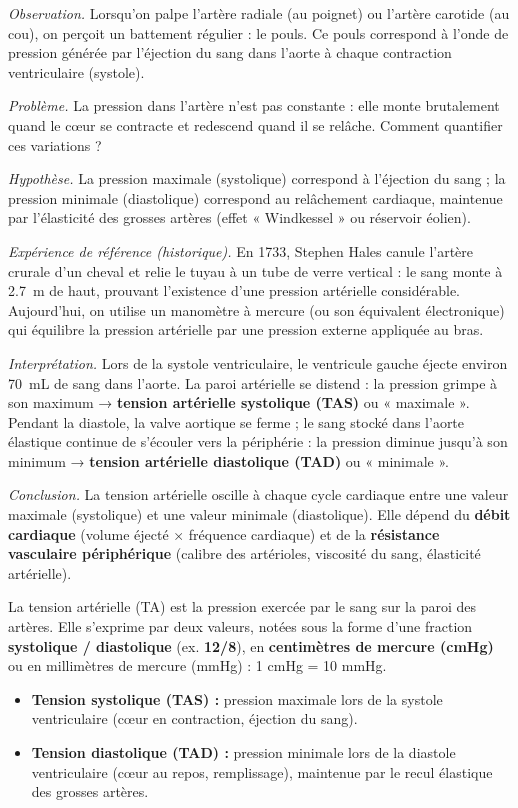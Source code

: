 \documentclass[11pt]{article}
\newcommand{\cle}[1]{{\popxbold\color{popdark}#1}}
\begin{document}
\emph{Observation.} Lorsqu'on palpe l'artère radiale (au poignet) ou l'artère carotide (au cou), on perçoit un battement régulier : le pouls. Ce pouls correspond à l'onde de pression générée par l'éjection du sang dans l'aorte à chaque contraction ventriculaire (systole).

\emph{Problème.} La pression dans l'artère n'est pas constante : elle monte brutalement quand le cœur se contracte et redescend quand il se relâche. Comment quantifier ces variations ?

\emph{Hypothèse.} La pression maximale (systolique) correspond à l'éjection du sang ; la pression minimale (diastolique) correspond au relâchement cardiaque, maintenue par l'élasticité des grosses artères (effet « Windkessel » ou réservoir éolien).

\emph{Expérience de référence (historique).} En 1733, Stephen Hales canule l'artère crurale d'un cheval et relie le tuyau à un tube de verre vertical : le sang monte à \SI{2,7}{m} de haut, prouvant l'existence d'une pression artérielle considérable. Aujourd'hui, on utilise un manomètre à mercure (ou son équivalent électronique) qui équilibre la pression artérielle par une pression externe appliquée au bras.

\emph{Interprétation.} Lors de la systole ventriculaire, le ventricule gauche éjecte environ \SI{70}{mL} de sang dans l'aorte. La paroi artérielle se distend : la pression grimpe à son maximum → \textbf{tension artérielle systolique (TAS)} ou « maximale ». Pendant la diastole, la valve aortique se ferme ; le sang stocké dans l'aorte élastique continue de s'écouler vers la périphérie : la pression diminue jusqu'à son minimum → \textbf{tension artérielle diastolique (TAD)} ou « minimale ».

\emph{Conclusion.} La tension artérielle oscille à chaque cycle cardiaque entre une valeur maximale (systolique) et une valeur minimale (diastolique). Elle dépend du \textbf{débit cardiaque} (volume éjecté × fréquence cardiaque) et de la \textbf{résistance vasculaire périphérique} (calibre des artérioles, viscosité du sang, élasticité artérielle).

\begin{definition}
La \cle{tension artérielle (TA)} est la pression exercée par le sang sur la paroi des artères. Elle s'exprime par deux valeurs, notées sous la forme d'une fraction \textbf{systolique / diastolique} (ex. \textbf{12/8}), en \textbf{centimètres de mercure (cmHg)} ou en millimètres de mercure (mmHg) : 1 cmHg = 10 mmHg.
\begin{itemize}
    \item \textbf{Tension systolique (TAS) :} pression maximale lors de la systole ventriculaire (cœur en contraction, éjection du sang).
    \item \textbf{Tension diastolique (TAD) :} pression minimale lors de la diastole ventriculaire (cœur au repos, remplissage), maintenue par le recul élastique des grosses artères.
\end{itemize}
\end{definition}
\end{document}
